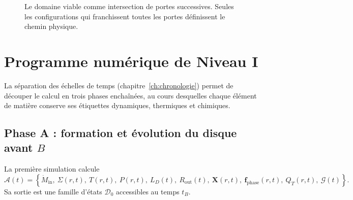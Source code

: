 \documentclass[11pt,a4paper,openany]{report}
\begin{document}

\begin{figure}[htbp]
\centering
{}
\caption{Le domaine viable comme intersection de portes successives. Seules les configurations
qui franchissent toutes les portes définissent le chemin physique.}
\label{fig:portes}
\end{figure}

\chapter{Programme numérique de Niveau I}
\label{ch:programme}

La séparation des échelles de temps (chapitre~\ref{ch:chronologie}) permet de découper le calcul en
trois phases enchaînées, au cours desquelles chaque élément de matière conserve ses étiquettes
dynamiques, thermiques et chimiques.

\section{Phase A : formation et évolution du disque avant \texorpdfstring{$B$}{B}}

La première simulation calcule
\begin{equation}
\mathcal{A}(t)=\left\{\dot M_{\mathrm{in}},\ \Sigma(r,t),\ T(r,t),\ P(r,t),\ L_D(t),\
R_{\mathrm{out}}(t),\ \mathbf{X}(r,t),\ \mathbf{f}_{\mathrm{phase}}(r,t),\ Q_T(r,t),\ \mathcal{G}(t)\right\}.
\label{eq:phaseA}
\end{equation}
Sa sortie est une famille d'états $\mathcal{D}_0$ accessibles au temps $t_B$.
\end{document}
